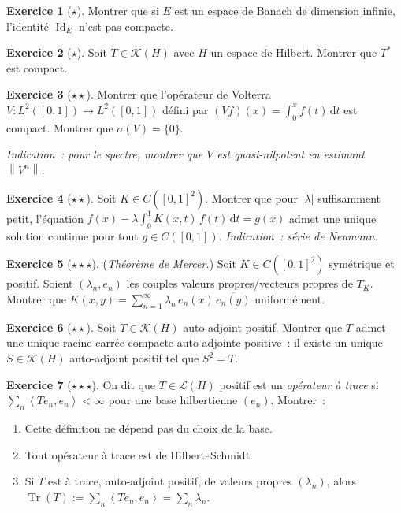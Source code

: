 \documentclass[a4paper,12pt]{book}
\DeclareMathOperator{\Id}{Id}
\DeclareMathOperator{\Tr}{Tr}
\newcommand{\dd}{\mathrm{d}}
\newcommand{\norm}[1]{\left\| #1 \right\|}
\newcommand{\abs}[1]{\left| #1 \right|}
\newcommand{\inner}[2]{\left\langle #1, #2 \right\rangle}
\theoremstyle{definition}
\newtheorem{exercice}{Exercice}[chapter]
\theoremstyle{plain}
\theoremstyle{remark}
\begin{document}
\begin{exercice}[$\star$]
Montrer que si $E$ est un espace de Banach de dimension infinie, l'identité $\Id_E$ n'est
pas compacte.
\end{exercice}

\begin{exercice}[$\star$]
Soit $T \in \mathcal{K}(H)$ avec $H$ un espace de Hilbert. Montrer que $T^*$ est
compact.
\end{exercice}

\begin{exercice}[$\star\star$]
Montrer que l'opérateur de Volterra $V : L^2([0,1]) \to L^2([0,1])$ défini par
$(Vf)(x) = \int_0^x f(t)\,\dd t$ est compact. Montrer que $\sigma(V) = \{0\}$.

\emph{Indication~: pour le spectre, montrer que $V$ est quasi-nilpotent en estimant
$\norm{V^n}$.}
\end{exercice}

\begin{exercice}[$\star\star$]
Soit $K \in C([0,1]^2)$. Montrer que pour $\abs{\lambda}$ suffisamment petit, l'équation
$f(x) - \lambda \int_0^1 K(x,t)\,f(t)\,\dd t = g(x)$ admet une unique solution continue
pour tout $g \in C([0,1])$. \emph{Indication~: série de Neumann.}
\end{exercice}

\begin{exercice}[$\star\star\star$]
(\emph{Théorème de Mercer.}) Soit $K \in C([0,1]^2)$ symétrique et positif. Soient
$(\lambda_n, e_n)$ les couples valeurs propres/vecteurs propres de $T_K$. Montrer que
$K(x,y) = \sum_{n=1}^\infty \lambda_n\,e_n(x)\,\overline{e_n(y)}$ uniformément.
\end{exercice}

\begin{exercice}[$\star\star$]
Soit $T \in \mathcal{K}(H)$ auto-adjoint positif. Montrer que $T$ admet une unique racine
carrée compacte auto-adjointe positive~: il existe un unique $S \in \mathcal{K}(H)$
auto-adjoint positif tel que $S^2 = T$.
\end{exercice}

\begin{exercice}[$\star\star\star$]
On dit que $T \in \mathcal{L}(H)$ positif est un \emph{opérateur à trace} si
$\sum_n \inner{Te_n}{e_n} < \infty$ pour une base hilbertienne $(e_n)$. Montrer~:
\begin{enumerate}[label=(\alph*)]
  \item Cette définition ne dépend pas du choix de la base.
  \item Tout opérateur à trace est de Hilbert--Schmidt.
  \item Si $T$ est à trace, auto-adjoint positif, de valeurs propres $(\lambda_n)$, alors
        $\Tr(T) := \sum_n \inner{Te_n}{e_n} = \sum_n \lambda_n$.
\end{enumerate}
\end{exercice}
\end{document}
